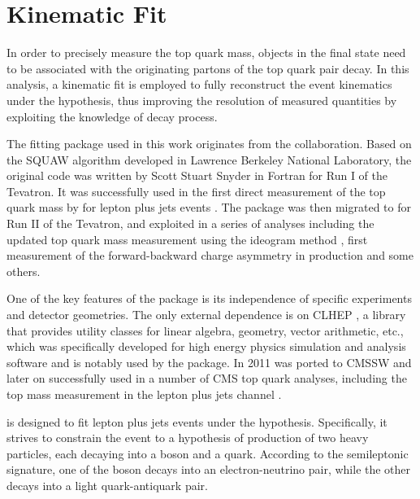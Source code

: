 \newpage
\section{Kinematic Fit}
\label{s_top_mass:kinematic_fit}

In order to precisely measure the top quark mass, objects in the final state need to be associated with the originating
partons of the top quark pair decay. In this analysis, a kinematic fit is employed to fully reconstruct the event
kinematics under the \ttbar hypothesis, thus improving the resolution of measured quantities by exploiting the knowledge
of decay process.

The \HitFit fitting package \autocite{HitFit} used in this work originates from the \Dzero collaboration. Based on the
SQUAW algorithm \autocite{SQUAW} developed in Lawrence Berkeley National Laboratory, the original \HitFit code was
written by Scott Stuart Snyder in Fortran for Run I of the Tevatron. It was successfully used in the first direct
measurement of the top quark mass by \Dzero for lepton plus jets \ttbar events \autocite{D0_top_mass_1998}. The package
was then migrated to \Cplusplus for Run II of the Tevatron, and exploited in a series of \ttbar analyses including the
updated top quark mass measurement using the ideogram method \autocite{D0_top_mass_ljets_ideogram}, first measurement of
the forward-backward charge asymmetry in \ttbar production \autocite{D0_charge_assymetry} and some others.

One of the key features of the \HitFit package is its independence of specific experiments and detector geometries. The
only external dependence is on \textsc{CLHEP} \autocite{CLHEP}, a \Cplusplus library that provides utility classes for
linear algebra, geometry, vector arithmetic, etc., which was specifically developed for high energy physics simulation
and analysis software and is notably used by the \GEANTfour package. In 2011 \HitFit was ported to CMSSW and later on
successfully used in a number of CMS top quark analyses, including the top mass measurement in the lepton plus jets
channel \autocite{top_mass_ljets_CMS}.

\HitFit is designed to fit lepton plus jets events under the \ttbar hypothesis. Specifically, it strives to constrain
the event to a hypothesis of production of two heavy particles, each decaying into a \W boson and a \cPqb quark.
According to the semileptonic signature, one of the \W boson decays into an electron-neutrino pair, while the other
decays into a light quark-antiquark pair.

